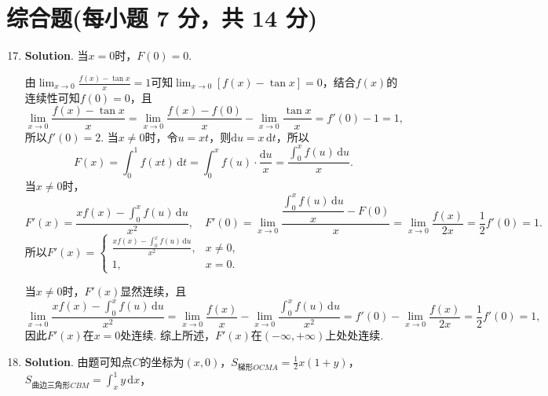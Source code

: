 \documentclass[../main.tex]{subfiles}
\begin{document}
\section{综合题(每小题 7 分，共 14 分)}
\begin{enumerate}
    \setcounter{enumi}{16}
    \item \textbf{Solution}. 当$x=0$时，$F(0)=0$.

          由$\lim_{x\to0}\frac{f(x)-\tan x}{x}=1$可知$\lim_{x\to 0}[f(x)-\tan x] = 0$，结合$f
              (x)$的连续性可知$f(0)=0$，且
          \[
              \lim_{x\to 0}\frac{f(x)-\tan x}{x}=\lim_{x\to0}\frac{f(x)-f(0)}{x}-\lim_{x\to0}
              \frac{\tan x}{x}=f'(0)-1=1,
          \]
          所以$f'(0)=2$. 当$x\neq 0$时，令$u=xt$，则$\mathrm{d}u=x\,\mathrm{d}t$，所以
          \[
              F(x)=\int_{0}^{1}f(xt)\,\mathrm{d}t=\int_{0}^{x}f(u)\cdot\frac{\mathrm{d}u}{x}
              =\frac{\displaystyle\int_{0}^{x}f(u)\,\mathrm{d}u}{x}.
          \]
          当$x\neq 0$时，
          \[
              F'(x)=\frac{xf(x)-\displaystyle\int_{0}^{x}f(u)\,\mathrm{d}u}{x^{2}},\quad F
              '(0)=\lim_{x\to 0}\frac{\dfrac{\displaystyle\int_{0}^{x}f(u)\,\mathrm{d}u}{x}-F(0)}{x}
              =\lim_{x\to0}\frac{f(x)}{2x}=\frac{1}{2}f'(0)=1.
          \]
          所以$F'(x)=
              \begin{cases}
                  \frac{xf(x)-\displaystyle\int_{0}^{x}f(u)\,\mathrm{d}u}{x^2}, & x\neq 0, \\
                  1,                                                            & x=0.
              \end{cases}$

          当$x\neq0$时，$F'(x)$显然连续，且
          \[
              \lim_{x\to 0}\frac{xf(x)-\displaystyle\int_{0}^{x}f(u)\,\mathrm{d}u}{x^{2}}
              =\lim_{x\to0}\frac{f(x)}{x}-\lim_{x\to0}\frac{\displaystyle\int_{0}^{x}f(u)\,\mathrm{d}u}{x^{2}}
              =f'(0)-\lim_{x\to0}\frac{f(x)}{2x}=\frac{1}{2}f'(0)=1,
          \]
          因此$F'(x)$在$x=0$处连续. 综上所述，$F'(x)$在$(-\infty,+\infty)$上处处连续.

    \item \textbf{Solution}. 由题可知点$C$的坐标为$(x,0)$，$S_{\text{梯形}OCMA}
              =\frac{1}{2}x(1+y)$，$S_{\text{曲边三角形}CBM}=\int_{x}^{1}y\,\mathrm{d}x$，


\end{enumerate}
\end{document}
